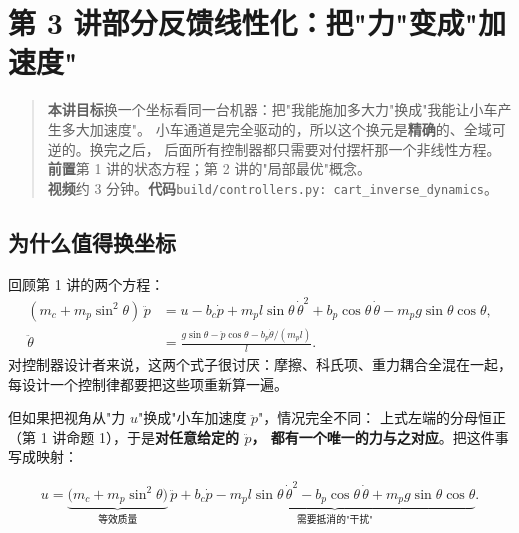 \chapter[反馈线性化]{第 3 讲\quad 部分反馈线性化：把"力"变成"加速度"}
\label{ch:fbl}

\begin{quote}\small
\textbf{本讲目标}\quad 换一个坐标看同一台机器：把"我能施加多大力"换成"我能让小车产生多大加速度"。
小车通道是完全驱动的，所以这个换元是\textbf{精确}的、全域可逆的。换完之后，
后面所有控制器都只需要对付摆杆那一个非线性方程。\\[2pt]
\textbf{前置}\quad 第 1 讲的状态方程；第 2 讲的"局部最优"概念。\\
\textbf{视频}\quad 约 3 分钟。\quad\textbf{代码}\quad \texttt{build/controllers.py: cart\_inverse\_dynamics}。
\end{quote}

\section{为什么值得换坐标}

回顾第 1 讲的两个方程：
\begin{align}
  (m_c+m_p\sin^2\theta)\,\ddot p &= u - b_c\dot p + m_p l\sin\theta\,\dot\theta^2
     + b_p\cos\theta\,\dot\theta - m_p g\sin\theta\cos\theta,\\
  \ddot\theta &= \frac{g\sin\theta - \ddot p\cos\theta - b_p\dot\theta/(m_p l)}{l}.
\end{align}
对控制器设计者来说，这两个式子很讨厌：摩擦、科氏项、重力耦合全混在一起，
每设计一个控制律都要把这些项重新算一遍。

但如果把视角从"力 $u$"换成"小车加速度 $\ddot p$"，情况完全不同：
上式左端的分母恒正（第 1 讲命题 1），于是\textbf{对任意给定的 $\ddot p$，
都有一个唯一的力与之对应}。把这件事写成映射：

\begin{equation}
  u = \underbrace{\big(m_c+m_p\sin^2\theta\big)}_{\text{等效质量}}\,\ddot p
      + \underbrace{b_c\dot p - m_p l\sin\theta\,\dot\theta^2
        - b_p\cos\theta\,\dot\theta + m_p g\sin\theta\cos\theta}_{\text{需要抵消的"干扰"}} .
  \label{eq:inv}
\end{equation}


